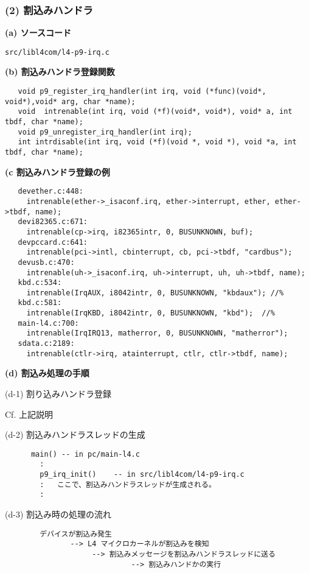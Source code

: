 {\subsubsection{(2) 割込みハンドラ}

{\bf\flushleft  (a) ソースコード}

       \verb|src/libl4com/l4-p9-irq.c|
    

{\bf\flushleft  (b) 割込みハンドラ登録関数}

\begin{verbatim}
   void p9_register_irq_handler(int irq, void (*func)(void*, void*),void* arg, char *name);
   void  intrenable(int irq, void (*f)(void*, void*), void* a, int tbdf, char *name);
   void p9_unregister_irq_handler(int irq);
   int intrdisable(int irq, void (*f)(void *, void *), void *a, int tbdf, char *name);
\end{verbatim}
    
{\bf\flushleft (c 割込みハンドラ登録の例}

\begin{verbatim}
   devether.c:448: 
     intrenable(ether->_isaconf.irq, ether->interrupt, ether, ether->tbdf, name); 
   devi82365.c:671: 
     intrenable(cp->irq, i82365intr, 0, BUSUNKNOWN, buf);
   devpccard.c:641: 
     intrenable(pci->intl, cbinterrupt, cb, pci->tbdf, "cardbus");
   devusb.c:470: 
     intrenable(uh->_isaconf.irq, uh->interrupt, uh, uh->tbdf, name); 
   kbd.c:534: 
     intrenable(IrqAUX, i8042intr, 0, BUSUNKNOWN, "kbdaux"); //%
   kbd.c:581: 
     intrenable(IrqKBD, i8042intr, 0, BUSUNKNOWN, "kbd");  //%
   main-l4.c:700: 
     intrenable(IrqIRQ13, matherror, 0, BUSUNKNOWN, "matherror");
   sdata.c:2189: 
     intrenable(ctlr->irq, atainterrupt, ctlr, ctlr->tbdf, name);
\end{verbatim}


{\bf\flushleft (d) 割込み処理の手順}

    (d-1) 割り込みハンドラ登録

         Cf. 上記説明

    (d-2) 割込みハンドラスレッドの生成

\begin{verbatim}
      main() -- in pc/main-l4.c 
        :
        p9_irq_init()    -- in src/libl4com/l4-p9-irq.c
        :   ここで、割込みハンドラスレッドが生成される。
        :
\end{verbatim}

    (d-3) 割込み時の処理の流れ
\begin{verbatim}
        デバイスが割込み発生
               --> L4 マイクロカーネルが割込みを検知 
                    --> 割込みメッセージを割込みハンドラスレッドに送る
                             --> 割込みハンドかの実行
\end{verbatim} 

}

